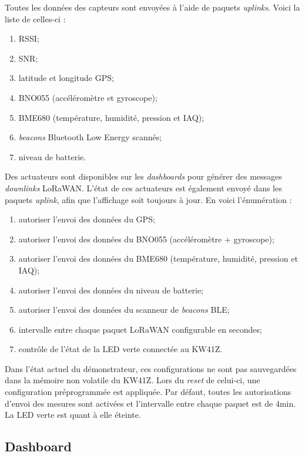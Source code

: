 Toutes les données des capteurs sont envoyées à l'aide de paquets \textit{uplinks}. Voici la liste de celles-ci :
\begin{enumerate}
    \item RSSI;
    \item SNR;
    \item latitude et longitude GPS;
    \item BNO055 (accéléromètre et gyroscope);
    \item BME680 (température, humidité, pression et IAQ);
    \item \textit{beacons} Bluetooth Low Energy scannés;
    \item niveau de batterie.\\
\end{enumerate}

Des actuateurs sont disponibles sur les \textit{dashboards} pour générer des messages \textit{downlinks} LoRaWAN. L'état de ces actuateurs est également envoyé dans les paquets \textit{uplink}, afin que l'affichage soit toujours à jour. En voici l'énumération :
\begin{enumerate}
    \item autoriser l'envoi des données du GPS;
    \item autoriser l'envoi des données du BNO055 (accéléromètre + gyroscope);
    \item autoriser l'envoi des données du BME680 (température, humidité, pression et IAQ);
    \item autoriser l'envoi des données du niveau de batterie;
    \item autoriser l'envoi des données du scanneur de \textit{beacons} BLE;
    \item intervalle entre chaque paquet LoRaWAN configurable en secondes;
    \item contrôle de l'état de la LED verte connectée au KW41Z.\\
\end{enumerate}

Dans l'état actuel du démonstrateur, ces configurations ne sont pas sauvegardées dans la mémoire non volatile du KW41Z. Lors du \textit{reset} de celui-ci, une configuration préprogrammée est appliquée. Par défaut, toutes les autorisations d'envoi des mesures sont activées et l'intervalle entre chaque paquet est de 4min. La LED verte est quant à elle éteinte.

\subsection{Dashboard}

